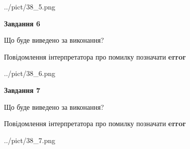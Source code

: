 \documentclass[10pt, ukrainian]{article}
\begin{document}
{\begin {large}
\begin{center}
	{../pict/38_5.png}
\end{center}
\newpage

{\begin {center}\textbf{Завдання 6}\end {center}}\par
Що буде виведено за виконання? \par
Повідомлення інтерпретатора про помилку позначати \textbf{error}

\begin{center}
	{../pict/38_6.png}
\end{center}
\newpage

{\begin {center}\textbf{Завдання 7}\end {center}}\par
Що буде виведено за виконання? \par
Повідомлення інтерпретатора про помилку позначати \textbf{error}

\begin{center}
	{../pict/38_7.png}
\end{center}
\newpage

\end {large}}
\end{document}
